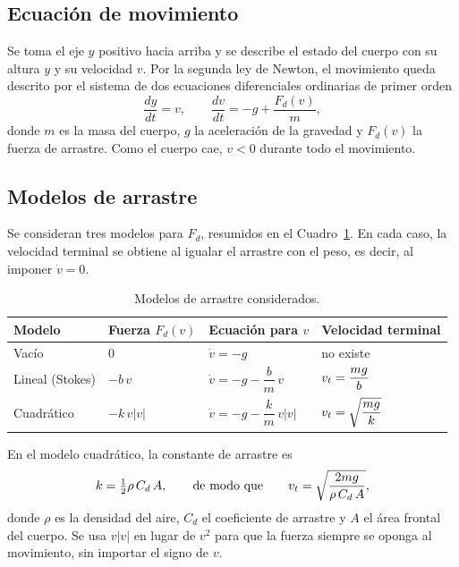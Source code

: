 \subsection{Ecuación de movimiento}

Se toma el eje $y$ positivo hacia arriba y se describe el estado del cuerpo con su altura $y$ y su velocidad $v$. Por la segunda ley de Newton, el movimiento queda descrito por el sistema de dos ecuaciones diferenciales ordinarias de primer orden
\begin{equation}
  \frac{dy}{dt} = v, \qquad \frac{dv}{dt} = -g + \frac{F_d(v)}{m},
  \label{eq:movimiento}
\end{equation}
donde $m$ es la masa del cuerpo, $g$ la aceleración de la gravedad y $F_d(v)$ la fuerza de arrastre. Como el cuerpo cae, $v<0$ durante todo el movimiento.

\subsection{Modelos de arrastre}

Se consideran tres modelos para $F_d$, resumidos en el Cuadro~\ref{tab:modelos}. En cada caso, la velocidad terminal se obtiene al igualar el arrastre con el peso, es decir, al imponer $\dot v = 0$.

\begin{table}[H]
  \centering
  \caption{Modelos de arrastre considerados.}
  \label{tab:modelos}
  \renewcommand{\arraystretch}{1.6}
  \begin{tabular}{@{}llll@{}}
    \toprule
    Modelo & Fuerza $F_d(v)$ & Ecuación para $v$ & Velocidad terminal \\
    \midrule
    Vacío & $0$ & $\dot v = -g$ & no existe \\
    Lineal (Stokes) & $-b\,v$ & $\dot v = -g - \dfrac{b}{m}\,v$ & $v_t = \dfrac{mg}{b}$ \\
    Cuadrático & $-k\,v\lvert v\rvert$ & $\dot v = -g - \dfrac{k}{m}\,v\lvert v\rvert$ & $v_t = \sqrt{\dfrac{mg}{k}}$ \\
    \bottomrule
  \end{tabular}
\end{table}

En el modelo cuadrático, la constante de arrastre es
\begin{equation}
  k = \tfrac12 \rho\, C_d\, A,
  \qquad\text{de modo que}\qquad
  v_t = \sqrt{\frac{2mg}{\rho\, C_d\, A}},
  \label{eq:k}
\end{equation}
donde $\rho$ es la densidad del aire, $C_d$ el coeficiente de arrastre y $A$ el área frontal del cuerpo. Se usa $v\lvert v\rvert$ en lugar de $v^2$ para que la fuerza siempre se oponga al movimiento, sin importar el signo de $v$.

